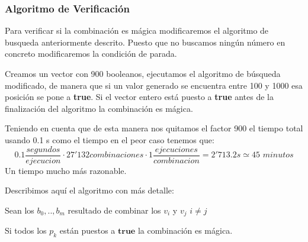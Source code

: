 \subsubsection{Algoritmo de Verificación}
Para verificar si la combinación es mágica modificaremos el algoritmo de
busqueda anteriormente descrito. Puesto que no buscamos ningún número en
concreto modificaremos la condición de parada.

Creamos un vector con 900 booleanos, ejecutamos el algoritmo de búsqueda
modificado, de manera que si un valor generado se encuentra entre 100 y 1000
esa posición se pone a \textbf{true}. Si el vector entero está puesto a
\textbf{true} antes de la finalización del algoritmo la combinación es mágica.

Teniendo en cuenta que de esta manera nos quitamos el factor 900 el tiempo total
usando 0.1 s como el tiempo en el peor caso tenemos que:
$$ 0.1\frac{segundos}{ejecucion} \cdot 27'132 combinaciones  \cdot 1 \frac{ejecuciones}{combinacion}=2'713.2s \simeq 45 \textit{ minutos}$$
Un tiempo mucho más razonable.

\vspace{0.25cm}
Describimos aquí el algoritmo con más detalle:
\vspace{0.25cm}

\begin{algorithm}[H]


 \hspace{0.25cm}	Sean los $b_0,..,b_{m}$ resultado de combinar los $v_i$ y $v_j$ $i \neq j$  \;

\end{algorithm}

Si todos los $p_k$ están puestos a $\textbf{true}$ la combinación es mágica.
